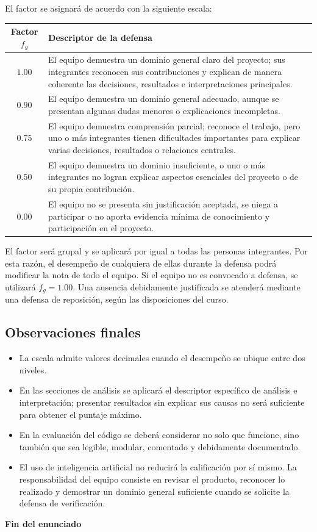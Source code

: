 \documentclass[12pt]{article}
\begin{document}
El factor se asignará de acuerdo con la siguiente escala:

\begin{center}
\begin{tabular}{|c|p{11.5cm}|}
\hline
\textbf{Factor \(f_g\)} & \textbf{Descriptor de la defensa} \\
\hline
\(1.00\) & El equipo demuestra un dominio general claro del proyecto; sus integrantes reconocen sus contribuciones y explican de manera coherente las decisiones, resultados e interpretaciones principales. \\
\hline
\(0.90\) & El equipo demuestra un dominio general adecuado, aunque se presentan algunas dudas menores o explicaciones incompletas. \\
\hline
\(0.75\) & El equipo demuestra comprensión parcial; reconoce el trabajo, pero uno o más integrantes tienen dificultades importantes para explicar varias decisiones, resultados o relaciones centrales. \\
\hline
\(0.50\) & El equipo demuestra un dominio insuficiente, o uno o más integrantes no logran explicar aspectos esenciales del proyecto o de su propia contribución. \\
\hline
\(0.00\) & El equipo no se presenta sin justificación aceptada, se niega a participar o no aporta evidencia mínima de conocimiento y participación en el proyecto. \\
\hline
\end{tabular}
\end{center}

El factor será grupal y se aplicará por igual a todas las personas integrantes. Por esta razón, el desempeño de cualquiera de ellas durante la defensa podrá modificar la nota de todo el equipo. Si el equipo no es convocado a defensa, se utilizará \(f_g=1.00\). Una ausencia debidamente justificada se atenderá mediante una defensa de reposición, según las disposiciones del curso.

\subsection*{Observaciones finales}
\begin{itemize}
    \item La escala admite valores decimales cuando el desempeño se ubique entre dos niveles.
    \item En las secciones de análisis se aplicará el descriptor específico de análisis e interpretación; presentar resultados sin explicar sus causas no será suficiente para obtener el puntaje máximo.
    \item En la evaluación del código se deberá considerar no solo que funcione, sino también que sea legible, modular, comentado y debidamente documentado.
    \item El uso de inteligencia artificial no reducirá la calificación por sí mismo. La responsabilidad del equipo consiste en revisar el producto, reconocer lo realizado y demostrar un dominio general suficiente cuando se solicite la defensa de verificación.
\end{itemize}


\begin{center}
\textbf{Fin del enunciado}
\end{center}
\end{document}
